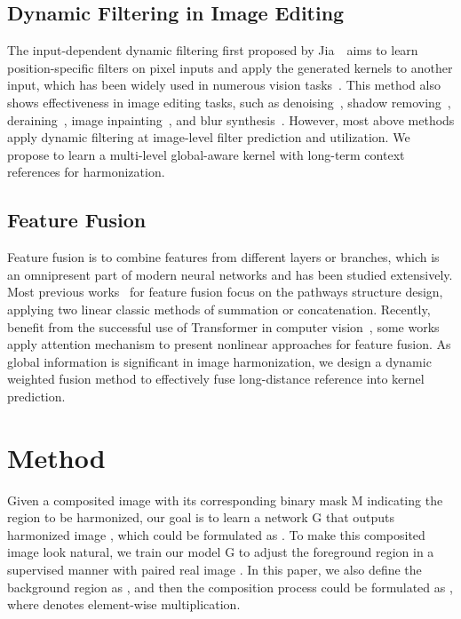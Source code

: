 \documentclass[10pt,twocolumn,letterpaper]{article}
\begin{document}
\subsection{Dynamic Filtering in Image Editing}
The input-dependent dynamic filtering first proposed by Jia~\cite{jia2016dynamic}~\etal aims to learn position-specific filters on pixel inputs and apply the generated kernels to another input, which has been widely used in numerous vision tasks~\cite{niklaus2017video,jo2018deep,yang2019condconv,dai2017deformable}. This method also shows effectiveness in image editing tasks, such as denoising~\cite{bako2017kernel,mildenhall2018burst,vogels2018denoising}, shadow removing~\cite{fu2021auto}, deraining~\cite{guo2021efficientderain}, image inpainting~\cite{li2022misf}, and blur synthesis~\cite{brooks2019learning}. However, most above methods apply dynamic filtering at image-level filter prediction and utilization. We propose to learn a multi-level global-aware kernel with long-term context references for harmonization.

\subsection{Feature Fusion} 
Feature fusion is to combine features from different layers or branches, which is an omnipresent part of modern neural networks and has been studied extensively. Most previous works~\cite{he2016deep,ronneberger2015u,lin2017feature} for feature fusion focus on the pathways structure design, applying two linear classic methods of summation or concatenation. Recently, benefit from the successful use of Transformer in computer vision~\cite{chen2020generative,dosovitskiy2020image,liu2021swin,zhang2021analogous,zhang2022eatformer,zhang2023rethinking,carion2020end,chen2020generative,esser2021taming,wan2021high,jiang2021transgan,liu2021fuseformer,Guo_2021_ICCV}, some works~\cite{hu2018squeeze,li2019selective,zhang2018exfuse,dai2021attentional,zhang2022resnest,zhang2022scsnet,chen2023better} apply attention mechanism to present nonlinear approaches for feature fusion. As global information is significant in image harmonization, we design a dynamic weighted fusion method to effectively fuse long-distance reference into kernel prediction.

\section{Method}

Given a composited image  with its corresponding binary mask M indicating the region to be harmonized, our goal is to learn a network G that outputs harmonized image , which could be formulated as . To make this composited image  look natural, we train our model G to adjust the foreground region  in a supervised manner with paired real image . In this paper, we also define the background region as , and then the composition process could be formulated as , where  denotes element-wise multiplication.
\end{document}
